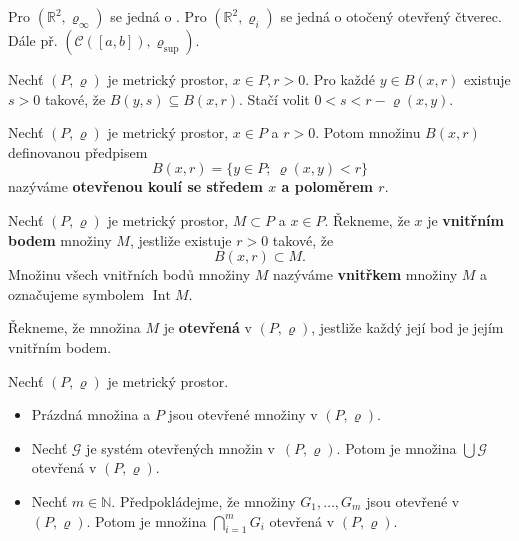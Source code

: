 \begin{priklad}
	Pro $(\mathbb R ^2, \varrho_\infty)$ se jedná o . Pro $(\mathbb R ^2, \varrho_i)$
	se jedná o otočený otevřený čtverec. Dále př. $(\mathscr C([a,b]), \varrho_{\sup})$.
\end{priklad}

\begin{pozorovani}
	Nechť $(P,\varrho)$ je metrický prostor, $x \in P, r >0$. Pro každé $y \in B(x,r)$ existuje $s>0$
	takové, že $B(y,s)\subseteq B(x,r)$. Stačí volit $0 < s < r-\varrho(x,y)$.
\end{pozorovani}

\begin{definice}
Nechť $(P,\varrho)$ je metrický prostor, $x\in P$ a $r>0$. Potom množinu $B(x,r)$ definovanou předpisem
\[
B(x,r)=\{y\in P;\ \varrho(x,y)<r\}
\]
nazýváme \textbf{otevřenou koulí se středem $x$ a poloměrem $r$}.
\end{definice}

\begin{definice}
Nechť $(P,\varrho)$ je metrický prostor, $M\subset P$ a $x\in P$. Řekneme, že $x$ je \textbf{vnitřním bodem} množiny $M$, jestliže existuje $r>0$ takové, že
\[
B(x,r)\subset M.
\]
Množinu všech vnitřních bodů množiny $M$ nazýváme \textbf{vnitřkem} množiny $M$ a označujeme symbolem $\operatorname{Int}M$.

Řekneme, že množina $M$ je \textbf{otevřená} v $(P,\varrho)$, jestliže každý její bod je jejím vnitřním bodem.
\end{definice}

\begin{veta}\label{veta9.3}
Nechť $(P,\varrho)$ je metrický prostor.

\begin{itemize}
    \item[(a)] Prázdná množina a $P$ jsou otevřené množiny v $(P,\varrho)$.
    \item[(b)] Nechť $\mathcal{G}$ je systém otevřených množin v~$(P,\varrho)$. Potom je množina
    $
    \bigcup \mathcal{G}
    $
    otevřená v $(P,\varrho)$.
    \item[(c)] Nechť $m\in\mathbb{N}$. Předpokládejme, že množiny $G_1,\dots,G_m$ jsou otevřené v $(P,\varrho)$. Potom je množina
    $
    \bigcap_{i=1}^m G_i
    $
    otevřená v $(P,\varrho)$.
\end{itemize}
\end{veta}

